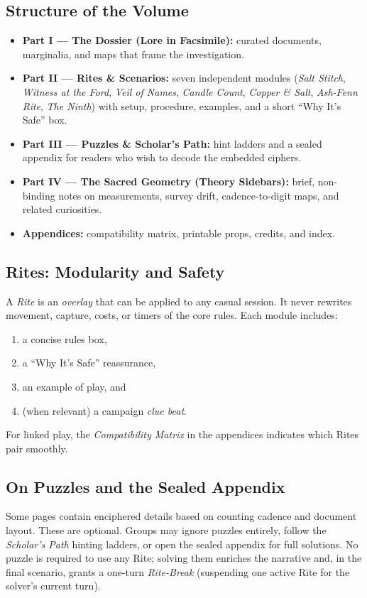 \documentclass[11pt]{article}
\begin{document}
\subsection{Structure of the Volume}
\begin{itemize}
  \item \textbf{Part I — The Dossier (Lore in Facsimile):} curated documents, marginalia, and maps that frame the investigation.
  \item \textbf{Part II — Rites \& Scenarios:} seven independent modules (\emph{Salt Stitch}, \emph{Witness at the Ford}, \emph{Veil of Names}, \emph{Candle Count}, \emph{Copper \& Salt}, \emph{Ash-Fenn Rite}, \emph{The Ninth}) with setup, procedure, examples, and a short “Why It’s Safe” box.
  \item \textbf{Part III — Puzzles \& Scholar’s Path:} hint ladders and a sealed appendix for readers who wish to decode the embedded ciphers.
  \item \textbf{Part IV — The Sacred Geometry (Theory Sidebars):} brief, non-binding notes on measurements, survey drift, cadence-to-digit maps, and related curiosities.
  \item \textbf{Appendices:} compatibility matrix, printable props, credits, and index.
\end{itemize}

\subsection{Rites: Modularity and Safety}
A \emph{Rite} is an \emph{overlay} that can be applied to any casual session. It never rewrites movement, capture, costs, or timers of the core rules. Each module includes:
\begin{enumerate}
  \item a concise rules box, 
  \item a “Why It’s Safe” reassurance, 
  \item an example of play, and 
  \item (when relevant) a campaign \emph{clue beat}.
\end{enumerate}
For linked play, the \emph{Compatibility Matrix} in the appendices indicates which Rites pair smoothly.

\subsection{On Puzzles and the Sealed Appendix}
Some pages contain enciphered details based on counting cadence and document layout. These are optional. Groups may ignore puzzles entirely, follow the \emph{Scholar’s Path} hinting ladders, or open the sealed appendix for full solutions. No puzzle is required to use any Rite; solving them enriches the narrative and, in the final scenario, grants a one-turn \emph{Rite-Break} (suspending one active Rite for the solver’s current turn).
\end{document}

